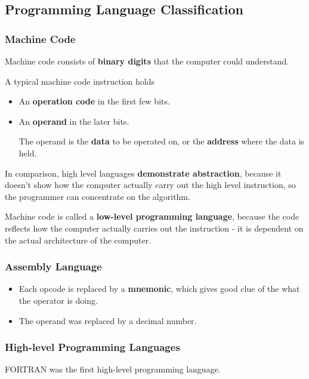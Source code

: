\subsection{Programming Language Classification}

\subsubsection*{Machine Code}

Machine code consists of \textbf{binary digits} that the computer could understand.

A typical machine code instruction holds
\begin{itemize}
    \item An \textbf{operation code} in the first few bits.
    \item An \textbf{operand} in the later bits.

        The operand is the \textbf{data} to be operated on, or the \textbf{address} where the data is held.
\end{itemize}

In comparison, high level languages \textbf{demonstrate abstraction}, because it doesn't show how the computer actually carry out the high level instruction, so the programmer can concentrate on the algorithm.

Machine code is called a \textbf{low-level programming language}, because the code reflects how the computer actually carries out the instruction - it is dependent on the actual architecture of the computer.

\subsubsection*{Assembly Language}

\begin{itemize}
    \item Each opcode is replaced by a \textbf{mnemonic}, which gives good clue of the what the operator is doing.
    \item The operand was replaced by a decimal number.
\end{itemize}

\subsubsection*{High-level Programming Languages}

FORTRAN was the first high-level programming language.

